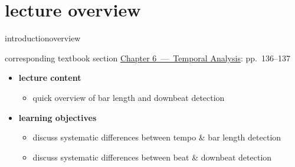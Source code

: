 




\subtitle{Module 6.3: Downbeat and Bar Length Detection}


	

    \section[overview]{lecture overview}
        \begin{frame}{introduction}{overview}
            \begin{block}{corresponding textbook section}
                    \href{http://ieeexplore.ieee.org/xpl/articleDetails.jsp?arnumber=6331123}{Chapter 6~---~Temporal Analysis}: pp.~136--137
            \end{block}

            \begin{itemize}
                \item   \textbf{lecture content}
                    \begin{itemize}
                        \item   quick overview of bar length and downbeat detection
                    \end{itemize}
                \bigskip
                \item<2->   \textbf{learning objectives}
                    \begin{itemize}
                        \item   discuss systematic differences between tempo \& bar length detection
                        \item   discuss systematic differences between beat \& downbeat detection
                    \end{itemize}
            \end{itemize}
        \end{frame}

